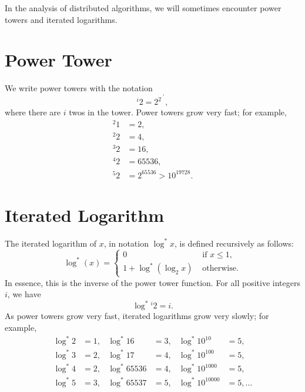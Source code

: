 
In the analysis of distributed algorithms, we will sometimes encounter power towers and iterated logarithms.


\section*{Power Tower}

We write power towers with the notation
\[
    {}^i 2 = 2^{2^{\cdot^{\cdot^2}}},
\]
where there are $i$ twos in the tower. Power towers grow very fast; for example,
\begin{align*}
    {}^2 1 &= 2,\\
    {}^2 2 &= 4,\\
    {}^3 2 &= 16,\\
    {}^4 2 &= 65536,\\
    {}^5 2 &= 2^{65536} > 10^{19728}.
\end{align*}


\section*{Iterated Logarithm}

The iterated logarithm of $x$, in notation $\log^* x$, is defined recursively as follows:
\[
    \log^*(x) = \begin{cases}
        0 & \text{ if $x \le 1$}, \\
        1 + \log^*(\log_2 x) & \text{ otherwise}.
    \end{cases}
\]
In essence, this is the inverse of the power tower function. For all positive integers $i$, we have
\[
    \log^* {}^i 2 = i.
\]
As power towers grow very fast, iterated logarithms grow very slowly; for example,
\begin{align*}
    \log^* 2 &= 1, &
    \log^* 16 &= 3, &
    \log^* 10^{10} &= 5, \\
    \log^* 3 &= 2, &
    \log^* 17 &= 4, &
    \log^* 10^{100} &= 5, \\
    \log^* 4 &= 2, &
    \log^* 65536 &= 4, &
    \log^* 10^{1000} &= 5, \\
    \log^* 5 &= 3, &
    \log^* 65537 &= 5, &
    \log^* 10^{10000} &= 5, \dotsc
\end{align*}
